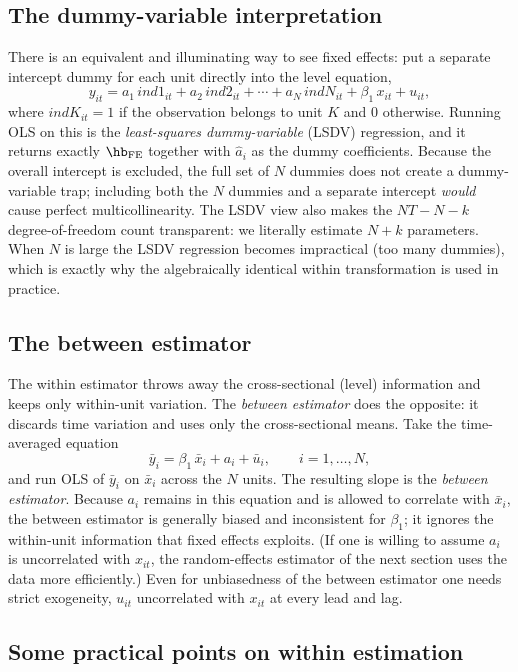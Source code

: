 \subsection{The dummy-variable interpretation}

There is an equivalent and illuminating way to see fixed effects: put a separate intercept dummy for each unit directly into the level equation,
\[
y_{it} = a_1\, ind1_{it} + a_2\, ind2_{it} + \cdots + a_N\, indN_{it} + \beta_1\, x_{it} + u_{it},
\]
where $indK_{it}=1$ if the observation belongs to unit $K$ and $0$ otherwise. Running OLS on this is the \emph{least-squares dummy-variable} (LSDV) regression, and it returns exactly $\hb_{\text{FE}}$ together with $\hat a_i$ as the dummy coefficients. Because the overall intercept is excluded, the full set of $N$ dummies does not create a dummy-variable trap; including both the $N$ dummies and a separate intercept \emph{would} cause perfect multicollinearity. The LSDV view also makes the $NT-N-k$ degree-of-freedom count transparent: we literally estimate $N+k$ parameters. When $N$ is large the LSDV regression becomes impractical (too many dummies), which is exactly why the algebraically identical within transformation is used in practice.

\subsection{The between estimator}

The within estimator throws away the cross-sectional (level) information and keeps only within-unit variation. The \emph{between estimator} does the opposite: it discards time variation and uses only the cross-sectional means. Take the time-averaged equation
\[
\bar y_i = \beta_1\,\bar x_i + a_i + \bar u_i, \qquad i=1,\dots,N,
\]
and run OLS of $\bar y_i$ on $\bar x_i$ across the $N$ units. The resulting slope is the \emph{between estimator}. Because $a_i$ remains in this equation and is allowed to correlate with $\bar x_i$, the between estimator is generally biased and inconsistent for $\beta_1$; it ignores the within-unit information that fixed effects exploits. (If one is willing to assume $a_i$ is uncorrelated with $x_{it}$, the random-effects estimator of the next section uses the data more efficiently.) Even for unbiasedness of the between estimator one needs strict exogeneity, $u_{it}$ uncorrelated with $x_{it}$ at every lead and lag.

\subsection{Some practical points on within estimation}

